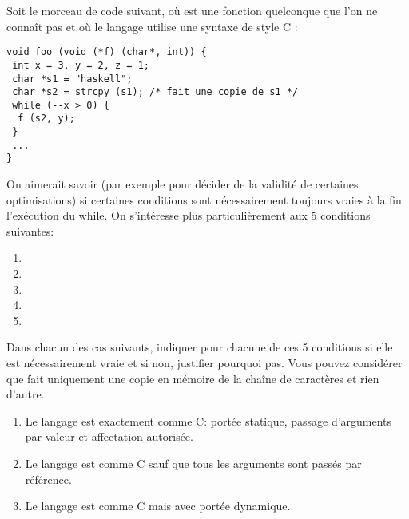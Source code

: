 \begin{Exercise}
\label{ex:fonction_raisonner2}
  Soit le morceau de code suivant, où  est une fonction
quelconque que l'on ne connaît pas et où le langage utilise une
syntaxe de style C :
\begin{verbatim}
void foo (void (*f) (char*, int)) {
 int x = 3, y = 2, z = 1;
 char *s1 = "haskell";
 char *s2 = strcpy (s1); /* fait une copie de s1 */
 while (--x > 0) {
  f (s2, y);
 }
 ...
}
\end{verbatim}
On aimerait savoir (par exemple pour décider de la validité de
certaines optimisations) si certaines conditions sont nécessairement
toujours vraies à la fin l'exécution du while.  On s'intéresse plus
particulièrement aux 5 conditions suivantes:
\begin{enumerate}
\item {}
\item {}
\item {}
\item {}
\item {}
\end{enumerate}
Dans chacun des cas suivants, indiquer pour chacune de ces 5 conditions
si elle est nécessairement vraie et si non, justifier pourquoi pas. Vous
pouvez considérer que  fait uniquement une copie en mémoire de la chaîne de caractères et
rien d'autre.
\begin{enumerate}
\item Le langage est exactement comme C: portée statique, passage d'arguments
  par valeur et affectation autorisée.
\item Le langage est comme C sauf que tous les arguments sont passés
  par référence.
\item Le langage est comme C mais avec portée dynamique.
\end{enumerate}
\end{Exercise}

